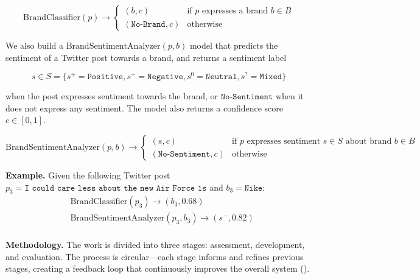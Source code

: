 \documentclass{article}
\begin{document}
\[
    \mathrm{BrandClassifier}(p) \rightarrow \begin{cases}
        (b, c)                 & \text{if } p \text{ expresses a brand } b \in
        B
        \\
        (\texttt{No-Brand}, c) & \text{otherwise}
    \end{cases}
\]

We also build a $\mathrm{BrandSentimentAnalyzer}(p, b)$ model that predicts the sentiment of a Twitter post towards a brand, and returns a sentiment label

\[
    s \in S =
    \{
    s^{+}=\texttt{Positive},
    s^{-}=\texttt{Negative},
    s^{0}=\texttt{Neutral},
    s^{?}=\texttt{Mixed}
    \}
\]

when the post expresses sentiment towards the brand, or $\texttt{No-Sentiment}$ when it does not express any sentiment. The model also returns a confidence score $c \in [0, 1]$.

\[
    \mathrm{BrandSentimentAnalyzer}(p, b) \rightarrow \begin{cases}
        (s, c)                     & \text{if } p \text{ expresses sentiment }
        s \in S \text{ about brand } b \in B
        \\
        (\texttt{No-Sentiment}, c) & \text{otherwise}
    \end{cases}
\]

\newpage

\textbf{Example.} Given the following Twitter post $p_3 = \texttt{I could care less about the new Air Force 1s}$ and $b_3 = \texttt{Nike}$:
\begin{align*}
     & \mathrm{BrandClassifier}(p_3) \rightarrow (b_3, 0.68)               \\
     & \mathrm{BrandSentimentAnalyzer}(p_3, b_3) \rightarrow (s^{-}, 0.82)
\end{align*}
\\
\textbf{Methodology.} The work is divided into three stages: assessment, development, and evaluation. The process is circular---each stage informs and refines previous stages, creating a feedback loop that continuously improves the overall system (\cite{ducange2019effective, colleoni2011measuring}).\\
\end{document}
